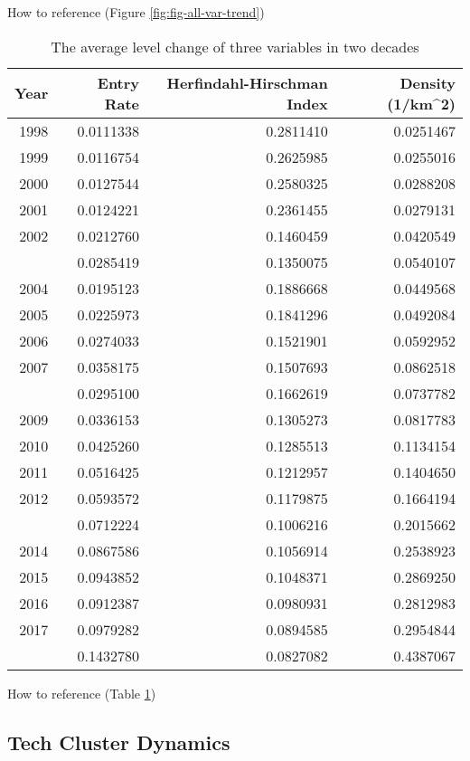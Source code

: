 \documentclass[
  12pt,
  oneside]{book}
\begin{document}
How to reference (Figure \ref{fig:fig-all-var-trend})

\begin{table}

\caption{\label{tab:tab-all-var-trend}The average level change of three variables in two decades}
\centering
\begin{tabular}[t]{rrrr}
\toprule
\textbf{Year} & \textbf{Entry Rate} & \textbf{Herfindahl-Hirschman Index} & \textbf{Density (1/km\textasciicircum{}2)}\\
\midrule
1998 & 0.0111338 & 0.2811410 & 0.0251467\\
1999 & 0.0116754 & 0.2625985 & 0.0255016\\
2000 & 0.0127544 & 0.2580325 & 0.0288208\\
2001 & 0.0124221 & 0.2361455 & 0.0279131\\
2002 & 0.0212760 & 0.1460459 & 0.0420549\\
\addlinespace
2003 & 0.0285419 & 0.1350075 & 0.0540107\\
2004 & 0.0195123 & 0.1886668 & 0.0449568\\
2005 & 0.0225973 & 0.1841296 & 0.0492084\\
2006 & 0.0274033 & 0.1521901 & 0.0592952\\
2007 & 0.0358175 & 0.1507693 & 0.0862518\\
\addlinespace
2008 & 0.0295100 & 0.1662619 & 0.0737782\\
2009 & 0.0336153 & 0.1305273 & 0.0817783\\
2010 & 0.0425260 & 0.1285513 & 0.1134154\\
2011 & 0.0516425 & 0.1212957 & 0.1404650\\
2012 & 0.0593572 & 0.1179875 & 0.1664194\\
\addlinespace
2013 & 0.0712224 & 0.1006216 & 0.2015662\\
2014 & 0.0867586 & 0.1056914 & 0.2538923\\
2015 & 0.0943852 & 0.1048371 & 0.2869250\\
2016 & 0.0912387 & 0.0980931 & 0.2812983\\
2017 & 0.0979282 & 0.0894585 & 0.2954844\\
\addlinespace
2018 & 0.1432780 & 0.0827082 & 0.4387067\\
\bottomrule
\end{tabular}
\end{table}

How to reference (Table \ref{tab:tab-all-var-trend})

\hypertarget{tech-cluster-dynamics}{%
\subsection{Tech Cluster Dynamics}\label{tech-cluster-dynamics}}
\end{document}
